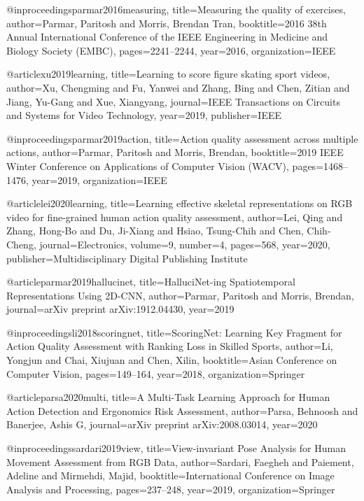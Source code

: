 @inproceedings{parmar2016measuring,
  title={Measuring the quality of exercises},
  author={Parmar, Paritosh and Morris, Brendan Tran},
  booktitle={2016 38th Annual International Conference of the IEEE Engineering in Medicine and Biology Society (EMBC)},
  pages={2241--2244},
  year={2016},
  organization={IEEE}
}

@article{xu2019learning,
  title={Learning to score figure skating sport videos},
  author={Xu, Chengming and Fu, Yanwei and Zhang, Bing and Chen, Zitian and Jiang, Yu-Gang and Xue, Xiangyang},
  journal={IEEE Transactions on Circuits and Systems for Video Technology},
  year={2019},
  publisher={IEEE}
}

@inproceedings{parmar2019action,
  title={Action quality assessment across multiple actions},
  author={Parmar, Paritosh and Morris, Brendan},
  booktitle={2019 IEEE Winter Conference on Applications of Computer Vision (WACV)},
  pages={1468--1476},
  year={2019},
  organization={IEEE}
}

@article{lei2020learning,
  title={Learning effective skeletal representations on RGB video for fine-grained human action quality assessment},
  author={Lei, Qing and Zhang, Hong-Bo and Du, Ji-Xiang and Hsiao, Tsung-Chih and Chen, Chih-Cheng},
  journal={Electronics},
  volume={9},
  number={4},
  pages={568},
  year={2020},
  publisher={Multidisciplinary Digital Publishing Institute}
}

@article{parmar2019hallucinet,
  title={HalluciNet-ing Spatiotemporal Representations Using 2D-CNN},
  author={Parmar, Paritosh and Morris, Brendan},
  journal={arXiv preprint arXiv:1912.04430},
  year={2019}
}

@inproceedings{li2018scoringnet,
  title={ScoringNet: Learning Key Fragment for Action Quality Assessment with Ranking Loss in Skilled Sports},
  author={Li, Yongjun and Chai, Xiujuan and Chen, Xilin},
  booktitle={Asian Conference on Computer Vision},
  pages={149--164},
  year={2018},
  organization={Springer}
}

@article{parsa2020multi,
  title={A Multi-Task Learning Approach for Human Action Detection and Ergonomics Risk Assessment},
  author={Parsa, Behnoosh and Banerjee, Ashis G},
  journal={arXiv preprint arXiv:2008.03014},
  year={2020}
}

@inproceedings{sardari2019view,
  title={View-invariant Pose Analysis for Human Movement Assessment from RGB Data},
  author={Sardari, Faegheh and Paiement, Adeline and Mirmehdi, Majid},
  booktitle={International Conference on Image Analysis and Processing},
  pages={237--248},
  year={2019},
  organization={Springer}
}

